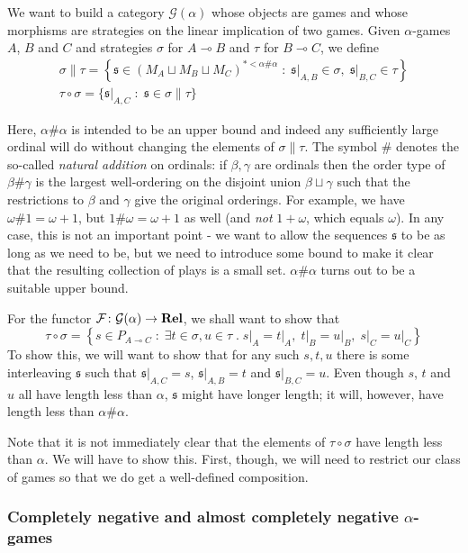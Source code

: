 \documentclass[11pt]{article} %
\theoremstyle{plain} %
\theoremstyle{definition} %
\theoremstyle{note}
\theoremstyle{exercisestyle}
\newcommand{\catname}[1]{{\normalfont\textbf{#1}}}
\newcommand{\Rel}{\catname{Rel}}
\newcommand*\from{\colon}
\newcommand{\cmap}[3]{#1\from{}#2\to{}#3}
\renewcommand{\implies}{\multimap}
\newcommand{\comp}[2]{#1 \circ #2}
\newcommand{\cprd}{\sqcup}
\newcommand{\G}{\mathcal G}
\newcommand{\suchthat}{\;\colon\;}
\newcommand{\esuchthat}{\;.\;}
\newcommand{\F}{\mathcal F}
\newcommand{\s}{\mathfrak s}
\begin{document}
We want to build a category $\G(\alpha)$ whose objects are games and whose morphisms are strategies on the linear implication of two games.  Given $\alpha$-games $A$, $B$ and $C$ and strategies $\sigma$ for $A\implies B$ and $\tau$ for $B\implies C$, we define
\begin{gather*}
  \sigma\|\tau = \left\{\s\in (M_A\cprd M_B\cprd M_C)^{*<\alpha\#\alpha}\suchthat \s\vert_{A,B}\in\sigma,\;\s\vert_{B,C}\in\tau\right\}\\
  \comp\tau\sigma = \{\s\vert_{A,C}\suchthat \s\in\sigma\|\tau\}
\end{gather*}

Here, $\alpha\#\alpha$ is intended to be an upper bound and indeed any sufficiently large ordinal will do without changing the elements of $\sigma\|\tau$.  The symbol $\#$ denotes the so-called \emph{natural addition} on ordinals: if $\beta,\gamma$ are ordinals then the order type of $\beta\#\gamma$ is the largest well-ordering on the disjoint union $\beta\sqcup\gamma$ such that the restrictions to $\beta$ and $\gamma$ give the original orderings.  For example, we have $\omega\#1=\omega+1$, but $1\#\omega=\omega+1$ as well (and \emph{not} $1+\omega$, which equals $\omega$).  In any case, this is not an important point - we want to allow the sequences $\s$ to be as long as we need to be, but we need to introduce some bound to make it clear that the resulting collection of plays is a small set.  $\alpha\#\alpha$ turns out to be a suitable upper bound.

For the functor $\cmap{\F}{\G(\alpha)}{\Rel}$, we shall want to show that
\[
  \comp\tau\sigma = \left\{s\in P_{A\implies C}\suchthat\exists t\in\sigma,u\in\tau\esuchthat s\vert_A=t\vert_A,\;t\vert_B=u\vert_B,\;s\vert_C=u\vert_C\right\}
  \]
To show this, we will want to show that for any such $s,t,u$ there is some interleaving $\s$ such that $\s\vert_{A,C}=s$, $\s\vert_{A,B}=t$ and $\s\vert_{B,C}=u$.  Even though $s$, $t$ and $u$ all have length less than $\alpha$, $\s$ might have longer length; it will, however, have length less than $\alpha\#\alpha$.

Note that it is not immediately clear that the elements of $\comp\tau\sigma$ have length less than $\alpha$.  We will have to show this.  First, though, we will need to restrict our class of games so that we do get a well-defined composition.

\subsubsection{Completely negative and almost completely negative $\alpha$-games}
\end{document}
